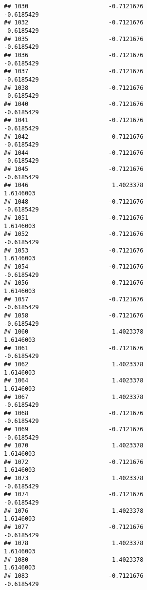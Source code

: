 \documentclass[
]{article}
\begin{document}
\begin{verbatim}
## 1030                       -0.7121676                       -0.6185429
## 1032                       -0.7121676                       -0.6185429
## 1035                       -0.7121676                       -0.6185429
## 1036                       -0.7121676                       -0.6185429
## 1037                       -0.7121676                       -0.6185429
## 1038                       -0.7121676                       -0.6185429
## 1040                       -0.7121676                       -0.6185429
## 1041                       -0.7121676                       -0.6185429
## 1042                       -0.7121676                       -0.6185429
## 1044                       -0.7121676                       -0.6185429
## 1045                       -0.7121676                       -0.6185429
## 1046                        1.4023378                        1.6146003
## 1048                       -0.7121676                       -0.6185429
## 1051                       -0.7121676                        1.6146003
## 1052                       -0.7121676                       -0.6185429
## 1053                       -0.7121676                        1.6146003
## 1054                       -0.7121676                       -0.6185429
## 1056                       -0.7121676                        1.6146003
## 1057                       -0.7121676                       -0.6185429
## 1058                       -0.7121676                       -0.6185429
## 1060                        1.4023378                        1.6146003
## 1061                       -0.7121676                       -0.6185429
## 1062                        1.4023378                        1.6146003
## 1064                        1.4023378                        1.6146003
## 1067                        1.4023378                       -0.6185429
## 1068                       -0.7121676                       -0.6185429
## 1069                       -0.7121676                       -0.6185429
## 1070                        1.4023378                        1.6146003
## 1072                       -0.7121676                        1.6146003
## 1073                        1.4023378                       -0.6185429
## 1074                       -0.7121676                       -0.6185429
## 1076                        1.4023378                        1.6146003
## 1077                       -0.7121676                       -0.6185429
## 1078                        1.4023378                        1.6146003
## 1080                        1.4023378                        1.6146003
## 1083                       -0.7121676                       -0.6185429

\end{verbatim}
\end{document}
